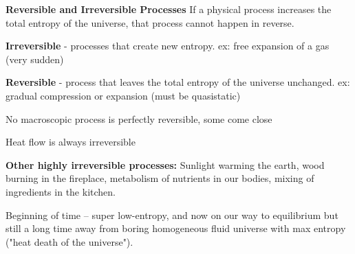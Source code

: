 \textbf{Reversible and Irreversible Processes}
If a physical process increases the total entropy of the universe, that process cannot happen in reverse.

\textbf{Irreversible} - processes that create new entropy. ex: free expansion of a gas (very sudden)

\textbf{Reversible} - process that leaves the total entropy of the universe unchanged. ex: gradual compression or expansion (must be quasistatic)

\begin{note}
No macroscopic process is perfectly reversible, some come close
\end{note}

Heat flow is always irreversible

\textbf{Other highly irreversible processes:} Sunlight warming the earth, wood burning in the fireplace, metabolism of nutrients in our bodies, mixing of ingredients in the kitchen.

Beginning of time -- super low-entropy, and now on our way to equilibrium but still a long time away from boring homogeneous fluid universe with max entropy ("heat death of the universe").